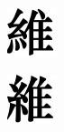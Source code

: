 \documentclass[12pt,twoside]{report}
\begin{document}
\begin{figure}[htbp]
    \centering
    \begin{subfigure}[b]{0.1\linewidth}
        \includegraphics[width=\linewidth]{./figures/fonts/642_0.jpg}
        \caption{}
        \label{fig:fonts1}
    \end{subfigure}
    \hfill
    \begin{subfigure}[b]{0.1\linewidth}
        \includegraphics[width=\linewidth]{./figures/fonts/642_1.jpg}

\end{subfigure}
\end{figure}
\end{document}
